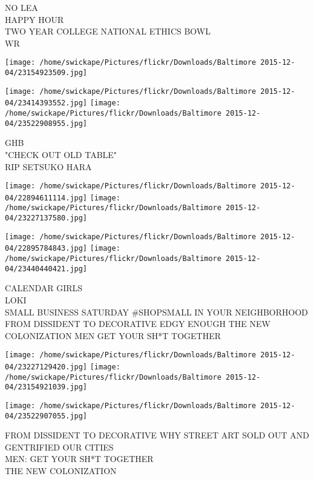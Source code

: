 \documentclass[10pt,letterpaper]{article}
\begin{document}
NO LEA\\
HAPPY HOUR\\
TWO YEAR COLLEGE NATIONAL ETHICS BOWL\\
WR\\
\pagebreak

\texttt{[image: /home/swickape/Pictures/flickr/Downloads/Baltimore 2015-12-04/23154923509.jpg]}

\vspace{0.25in}
\texttt{[image: /home/swickape/Pictures/flickr/Downloads/Baltimore 2015-12-04/23414393552.jpg]}
\texttt{[image: /home/swickape/Pictures/flickr/Downloads/Baltimore 2015-12-04/23522908955.jpg]}

GHB\\
"CHECK OUT OLD TABLE"\\
RIP SETSUKO HARA\\
\pagebreak

\texttt{[image: /home/swickape/Pictures/flickr/Downloads/Baltimore 2015-12-04/22894611114.jpg]}
\texttt{[image: /home/swickape/Pictures/flickr/Downloads/Baltimore 2015-12-04/23227137580.jpg]}

\texttt{[image: /home/swickape/Pictures/flickr/Downloads/Baltimore 2015-12-04/22895784843.jpg]}
\texttt{[image: /home/swickape/Pictures/flickr/Downloads/Baltimore 2015-12-04/23440440421.jpg]}

CALENDAR GIRLS\\
LOKI\\
SMALL BUSINESS SATURDAY \#SHOPSMALL IN YOUR NEIGHBORHOOD\\
FROM DISSIDENT TO DECORATIVE EDGY ENOUGH THE NEW COLONIZATION MEN GET YOUR SH*T TOGETHER\\
\pagebreak

\texttt{[image: /home/swickape/Pictures/flickr/Downloads/Baltimore 2015-12-04/23227129420.jpg]}
\texttt{[image: /home/swickape/Pictures/flickr/Downloads/Baltimore 2015-12-04/23154921039.jpg]}

\vspace{0.25in}
\texttt{[image: /home/swickape/Pictures/flickr/Downloads/Baltimore 2015-12-04/23522907055.jpg]}

FROM DISSIDENT TO DECORATIVE WHY STREET ART SOLD OUT AND GENTRIFIED OUR CITIES\\
MEN: GET YOUR SH*T TOGETHER\\
THE NEW COLONIZATION\\
\pagebreak
\end{document}
